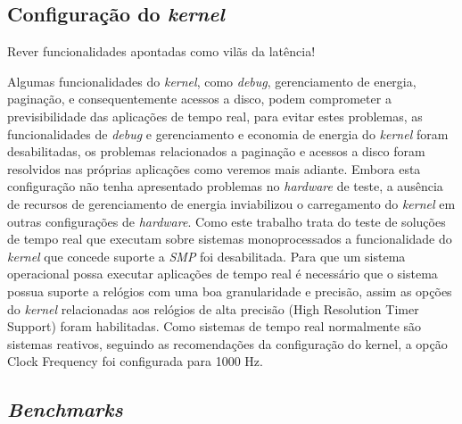 \subsection{Configuração do \textit{kernel}}  
Rever funcionalidades apontadas como vilãs da latência!

Algumas funcionalidades do \textit{kernel}, como \textit{debug}, gerenciamento de energia, paginação, e consequentemente acessos a disco, podem comprometer a previsibilidade das aplicações de tempo real, para evitar estes problemas, as funcionalidades de \textit{debug} e gerenciamento e economia de energia do \textit{kernel} foram desabilitadas, os problemas relacionados a paginação e acessos a disco foram resolvidos nas próprias aplicações como veremos mais adiante. Embora esta configuração não tenha apresentado problemas no \textit{hardware} de teste, a ausência de recursos de gerenciamento de energia inviabilizou o carregamento do \textit{kernel} em outras configurações de \textit{hardware}. Como este trabalho trata do teste de soluções de tempo real que executam sobre sistemas monoprocessados a funcionalidade do \textit{kernel} que concede suporte a \textit{SMP} foi desabilitada.
Para que um sistema operacional possa executar aplicações de tempo real é necessário que o sistema possua suporte a relógios com uma boa granularidade e precisão, assim as opções do \textit{kernel} relacionadas aos relógios de alta precisão (High Resolution Timer Support) foram habilitadas. Como sistemas de tempo real normalmente são sistemas reativos, seguindo as recomendações da configuração do kernel, a opção Clock Frequency foi configurada para 1000 Hz.

\subsection{\textit{Benchmarks}}
